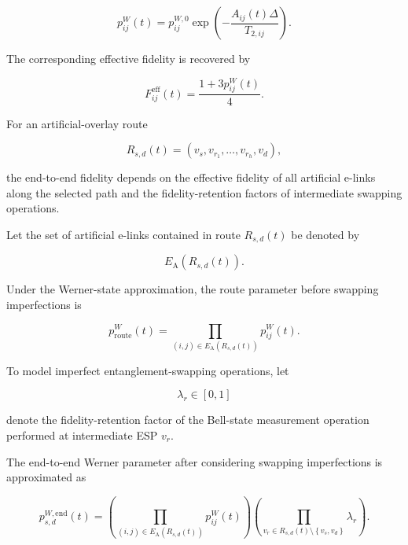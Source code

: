 \begin{equation}
    p_{ij}^{W}(t)
    =
    p_{ij}^{W,0}
    \exp
    \left(
    -\frac{
    A_{ij}(t)\Delta
    }{
    T_{2,ij}
    }
    \right).
\end{equation}

The corresponding effective fidelity is recovered by

\begin{equation}
    F_{ij}^{\mathrm{eff}}(t)
    =
    \frac{
    1+3p_{ij}^{W}(t)
    }{4}.
\end{equation}

For an artificial-overlay route

\begin{equation}
    R_{s,d}(t)
    =
    \left(
    v_s,
    v_{r_1},
    \ldots,
    v_{r_h},
    v_d
    \right),
\end{equation}

the end-to-end fidelity depends on the effective fidelity of all artificial e-links along the selected path and the fidelity-retention factors of intermediate swapping operations.

Let the set of artificial e-links contained in route $R_{s,d}(t)$ be denoted by

\begin{equation}
    E_{\mathrm{A}}
    \left(
    R_{s,d}(t)
    \right).
\end{equation}

Under the Werner-state approximation, the route parameter before swapping
imperfections is

\begin{equation}
    p_{\mathrm{route}}^{W}(t)
    =
    \prod_{
    (i,j)
    \in
    E_{\mathrm{A}}(R_{s,d}(t))
    }
    p_{ij}^{W}(t).
\end{equation}

To model imperfect entanglement-swapping operations, let

\begin{equation}
    \lambda_r
    \in
    [0,1]
\end{equation}

denote the fidelity-retention factor of the Bell-state measurement operation performed at intermediate ESP $v_r$.

The end-to-end Werner parameter after considering swapping imperfections is approximated as

\begin{equation}
    p_{s,d}^{W,\mathrm{end}}(t)
    =
    \left(
    \prod_{
    (i,j)
    \in
    E_{\mathrm{A}}(R_{s,d}(t))
    }
    p_{ij}^{W}(t)
    \right)
    \left(
    \prod_{
    v_r
    \in
    R_{s,d}(t)
    \setminus
    \left\{
    v_s,v_d
    \right\}
    }
    \lambda_r
    \right).
\end{equation}

